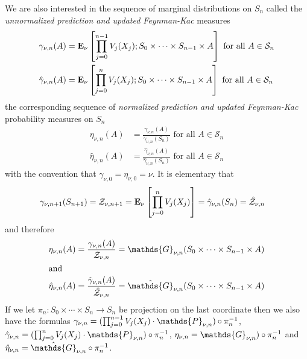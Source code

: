 We are also interested in the sequence of marginal distributions on $S_n$ called the \emph{unnormalized prediction and updated Feynman-Kac} measures
\begin{align*}
\gamma_{\nu, n}(A) &= \textbf{E}_{\nu}\left [\prod_{j=0}^{n-1} V_j(X_j) ; S_0 \times \dotsb \times S_{n-1} \times A \right] \text{ for all $A \in \mathcal{S}_n$}\\
\hat{\gamma}_{\nu, n}(A) &= \textbf{E}_{\nu}\left [\prod_{j=0}^{n} V_j(X_j) ; S_0 \times \dotsb \times S_{n-1} \times A \right] \text{ for all $A \in \mathcal{S}_n$}\\
\end{align*}
the corresponding sequence of \emph{normalized prediction and updated Feynman-Kac} probability measures on $S_n$
\begin{align*}
\eta_{\nu, n}(A) &= \frac{\gamma_{\nu, n}(A)}{\gamma_{\nu, n}(S_n)} \text{ for all $A \in \mathcal{S}_n$}\\
\hat{\eta}_{\nu, n}(A) &= \frac{\hat{\gamma}_{\nu, n}(A)}{\hat{\gamma}_{\nu, n}(S_n)} \text{ for all $A \in \mathcal{S}_n$}
\end{align*}
with the convention that $\gamma_{\nu, 0} = \eta_{\nu, 0} = \nu$.
It is elementary that
\begin{align*}
\gamma_{\nu, n+1}(S_{n+1}) &= \mathcal{Z}_{\nu, n+1} = \textbf{E}_{\nu}\left [\prod_{j=0}^n V_j(X_j) \right] = \hat{\gamma}_{\nu, n}(S_n) = \hat{\mathcal{Z}}_{\nu, n}
\end{align*}
and therefore 
\begin{align*}
\eta_{\nu, n}(A) &= \frac{\gamma_{\nu, n}(A)}{\mathcal{Z}_{\nu, n}} = \mathds{G}_{\nu, n}(S_0 \times \dotsb \times S_{n-1} \times A) \\
\intertext{and}
\hat{\eta}_{\nu, n}(A) &= \frac{\hat{\gamma}_{\nu, n}(A)}{\hat{\mathcal{Z}}_{\nu, n}} = \hat{\mathds{G}}_{\nu, n}(S_0 \times \dotsb \times S_{n-1} \times A) \\
\end{align*}
If we let $\pi_n : S_0 \times \dotsb \times S_n \to S_n$ be projection on the last coordinate then we also have the formulas $\gamma_{\nu, n} = \pushforward{\pi_n}{(\prod_{j=0}^{n-1} V_j(X_j) \cdot \mathds{P}_{\nu, n})}$, $\hat{\gamma}_{\nu, n} = \pushforward{\pi_n}{(\prod_{j=0}^{n} V_j(X_j) \cdot \mathds{P}_{\nu, n})}$, $\eta_{\nu, n} = \pushforward{\pi_n}{\mathds{G}_{\nu, n})}$ and $\hat{\eta}_{\nu, n} = \pushforward{\pi_n}{\hat{\mathds{G}}_{\nu, n}}$.

